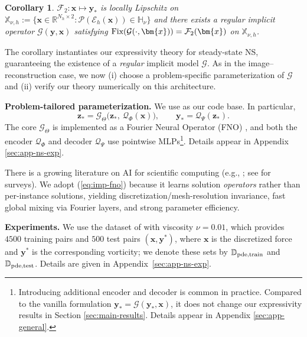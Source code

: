 \documentclass{amsart} %
\def\eqref#1{equation~\ref{#1}}
\def\vx{{\bm{x}}}
\def\vy{{\bm{y}}}
\def\vz{{\bm{z}}}
\def\sD{{\mathbb{D}}}
\def\sH{{\mathbb{H}}}
\def\sR{{\mathbb{R}}}
\def\sX{{\mathbb{X}}}
\def\cE{{\mathcal{E}}}
\def\cF{{\mathcal{F}}}
\def\cG{{\mathcal{G}}}
\def\cP{{\mathcal{P}}}
\def\cQ{{\mathcal{Q}}}
\newtheorem{corollary}[theorem]{Corollary}
\theoremstyle{definition}
\theoremstyle{remark}
\renewcommand{\eqref}[1]{\textup{(\ref{#1})}}
\begin{document}
\begin{corollary}
\label{coro:ns-discrete}
$\cF_{2}:\vx \mapsto \vy_\ast$ is locally Lipschitz on $\sX_{\nu,h}:=\{\vx \in \sR^{N_h \times 2}: \cP(\cE_{h}(\vx)) \in \sH_{\nu}\}$ and there exists a \textit{regular} implicit operator $\cG(\vy,\vx)$ satisfying $\textup{Fix}(\cG(\cdot,\vx)) = \cF_{2}(\vx)$ on $\sX_{\nu,h}$. 
\end{corollary}



The corollary instantiates our expressivity theory for steady-state NS, guaranteeing the existence of a \emph{regular} implicit model $\cG$. As in the image–reconstruction case, we now (i) choose a problem-specific parameterization of $\cG$ and (ii) verify our theory numerically on this architecture.


\textbf{Problem-tailored parameterization.}
We use \cite{marwah2023deep} as our code base. In particular,
\begin{equation}
\label{eq:imp-fno}
\vz_\ast = \cG_{\Theta}\!\big(\vz_\ast,\ \cQ_{\Phi}(\vx)\big),
\qquad
\vy_\ast = \cQ_{\Psi}(\vz_\ast).
\end{equation}
The core $\cG_\Theta$ is implemented as a Fourier Neural Operator (FNO) \cite{li2021fourier}, and both the encoder $\cQ_{\Phi}$ and decoder $\cQ_{\Psi}$ use pointwise MLPs\footnote{Introducing additional encoder and decoder is common in practice. Compared to the vanilla formulation $\vy_\ast=\cG(\vy_\ast,\vx)$, it does not change our expressivity results in Section \ref{sec:main-results}. Details appear in Appendix \ref{sec:app-general}.}. Details appear in Appendix \ref{sec:app-ns-exp}.

There is a growing literature on AI for scientific computing (e.g., \cites{raissi2019pinn,lu2021deeponet,li2021fourier,rahman2022uno,kovachki2023neural,li2023geofno}; see \cites{karniadakis2021piml,kovachki2024operatorreview} for surveys). We adopt \eqref{eq:imp-fno} because it learns solution \emph{operators} rather than per-instance solutions, yielding discretization/mesh-resolution invariance, fast global mixing via Fourier layers, and strong parameter efficiency.


\textbf{Experiments.} We use the dataset of \cite{marwah2023deep} with viscosity \(\nu=0.01\), which provides \(4500\) training pairs and \(500\) test pairs \((\vx,\vy^\ast)\), where \(\vx\) is the discretized force and \(\vy^\ast\) is the corresponding vorticity; we denote these sets by \(\sD_{\textup{pde,train}}\) and \(\sD_{\textup{pde,test}}\). Details are given in Appendix~\ref{sec:app-ns-exp}.
\end{document}
